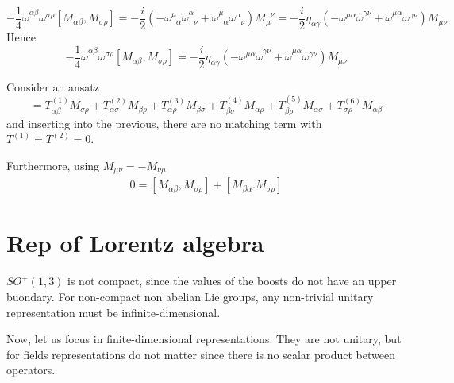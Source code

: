     \begin{equation*}
        - \frac{1}{4} \tilde \omega^{\alpha \beta} \omega^{\sigma \rho}[M_{\alpha \beta}, M_{\sigma \rho}] = -\frac{i}{2} (-\omega^{\mu}_{\phantom \mu \alpha} \tilde \omega^{\alpha}_{\phantom \alpha \nu} + \tilde \omega^{\mu}_{\phantom \mu \alpha} \omega^{\alpha}_{\phantom \alpha \nu}) M_\mu^{\phantom \mu\nu} = - \frac{i}{2} \eta_{\alpha \gamma} (-\omega^{\mu\alpha} \tilde \omega^{\gamma\nu} + \tilde \omega^{\mu\alpha} \omega^{\gamma \nu}) M_{\mu\nu}
    \end{equation*}
    Hence 
    \begin{equation*}
        - \frac{1}{4} \tilde \omega^{\alpha \beta} \omega^{\sigma \rho}[M_{\alpha \beta}, M_{\sigma \rho}] = - \frac{i}{2} \eta_{\alpha \gamma} (-\omega^{\mu\alpha} \tilde \omega^{\gamma\nu} + \tilde \omega^{\mu\alpha} \omega^{\gamma \nu}) M_{\mu\nu}
    \end{equation*}

    Consider an ansatz 
    \begin{equation*}
        [M_{\alpha\beta}, M_{\sigma\rho}] = T^{(1)}_{\alpha\beta} M_{\sigma\rho} + T^{(2)}_{\alpha\sigma} M_{\beta\rho} + T^{(3)}_{\alpha\rho} M_{\beta\sigma} + T^{(4)}_{\beta\sigma} M_{\alpha\rho} + T^{(5)}_{\beta\rho} M_{\alpha\sigma } + T^{(6)}_{\sigma\rho} M_{\alpha\beta}
    \end{equation*}
    and inserting into the previous, there are no matching term with $T^{(1)} = T^{(2)} = 0$. 


    Furthermore, using $M_{\mu\nu} = - M_{\nu\mu}$
    \begin{equation*}
    \begin{aligned}
        0 = [M_{\alpha\beta}, M_{\sigma \rho}] + [M_{\beta\alpha}. M_{\sigma\rho}]
    \end{aligned}
    \end{equation*}

\section{Rep of Lorentz algebra}

    $SO^+(1,3)$ is not compact, since the values of the boosts do not have an upper buondary. For non-compact non abelian Lie groups, any non-trivial unitary representation must be infinite-dimensional. 

    Now, let us focus in finite-dimensional representations. They are not unitary, but for fields representations do not matter since there is no scalar product between operators. 

